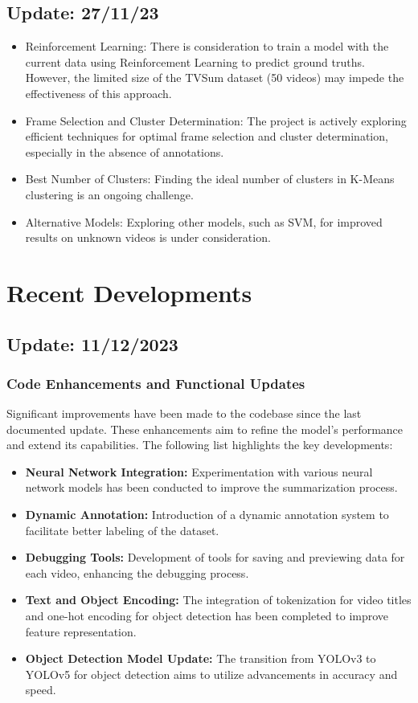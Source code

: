 \documentclass[conference]{IEEEtran}
\begin{document}
\subsection*{Update: 27/11/23}
\begin{itemize}
    \item Reinforcement Learning: There is consideration to train a model with the current data using Reinforcement Learning to predict ground truths. However, the limited size of the TVSum dataset (50 videos) may impede the effectiveness of this approach.
    \item Frame Selection and Cluster Determination: The project is actively exploring efficient techniques for optimal frame selection and cluster determination, especially in the absence of annotations.
    \item Best Number of Clusters: Finding the ideal number of clusters in K-Means clustering is an ongoing challenge.
    \item Alternative Models: Exploring other models, such as SVM, for improved results on unknown videos is under consideration.
\end{itemize}

\section*{Recent Developments}
\subsection*{Update: 11/12/2023}

\subsubsection*{Code Enhancements and Functional Updates}
Significant improvements have been made to the codebase since the last documented update. These enhancements aim to refine the model's performance and extend its capabilities. The following list highlights the key developments:

\begin{itemize}
    \item \textbf{Neural Network Integration:} Experimentation with various neural network models has been conducted to improve the summarization process.
    \item \textbf{Dynamic Annotation:} Introduction of a dynamic annotation system to facilitate better labeling of the dataset.
    \item \textbf{Debugging Tools:} Development of tools for saving and previewing data for each video, enhancing the debugging process.
    \item \textbf{Text and Object Encoding:} The integration of tokenization for video titles and one-hot encoding for object detection has been completed to improve feature representation.
    \item \textbf{Object Detection Model Update:} The transition from YOLOv3 to YOLOv5 for object detection aims to utilize advancements in accuracy and speed.
\end{itemize}
\end{document}

